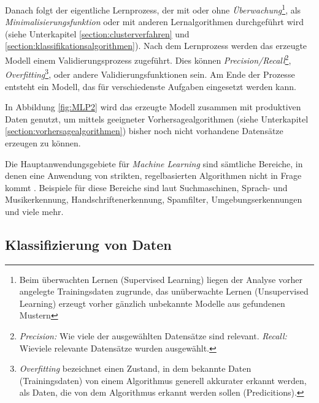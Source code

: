 Danach folgt der eigentliche Lernprozess, der mit oder ohne \textit{Überwachung}\footnote{Beim überwachten Lernen (Supervised Learning) liegen der Analyse vorher angelegte Trainingsdaten zugrunde, das unüberwachte Lernen (Unsupervised Learning) erzeugt vorher gänzlich unbekannte Modelle aus gefundenen Mustern }, als \textit{Minimalisierungsfunktion} oder mit anderen Lernalgorithmen durchgeführt wird (siehe Unterkapitel \ref{section:clusterverfahren} und  \ref{section:klassifikationsalgorithmen}). Nach dem Lernprozess werden das erzeugte Modell einem Validierungsprozess zugeführt. Dies können \textit{Precision/Recall}\footnote{\textit{Precision:} Wie viele der ausgewählten Datensätze sind relevant. \textit{Recall:} Wieviele relevante Datensätze wurden ausgewählt. }, \textit{Overfitting}\footnote{\textit{Overfitting} bezeichnet einen Zustand, in dem bekannte Daten (Trainingsdaten) von einem Algorithmus generell akkurater erkannt werden, als Daten, die von dem Algorithmus erkannt werden sollen (Predicitions).}, oder andere Validierungsfunktionen sein. Am Ende der Prozesse entsteht ein Modell, das für verschiedenste Aufgaben eingesetzt werden kann. 

In Abbildung \ref{fig:MLP2} wird das erzeugte Modell zusammen mit produktiven Daten genutzt, um mittels geeigneter Vorhersagealgorithmen (siehe Unterkapitel \ref{section:vorhersagealgorithmen}) bisher noch nicht vorhandene Datensätze erzeugen zu können.  

Die Hauptanwendungsgebiete für \textit{Machine Learning} sind sämtliche Bereiche, in denen eine Anwendung von strikten, regelbasierten Algorithmen nicht in Frage kommt . Beispiele für diese Bereiche sind laut  Suchmaschinen, Sprach- und Musikerkennung, Handschriftenerkennung, Spamfilter, Umgebungserkennungen und viele mehr. 



\subsection{Klassifizierung von Daten}
\label{section:klassifizierung von daten}


